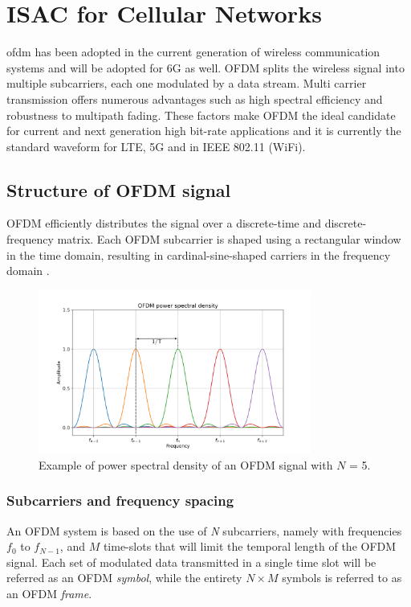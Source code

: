 \chapter{ISAC for Cellular Networks}
\label{chap:theoretical_OFDM}

\gls{ofdm} has been adopted in the current generation of wireless communication systems and will be adopted for 6G as well.
OFDM splits the wireless signal into multiple subcarriers, each one modulated by a data stream. Multi carrier transmission offers numerous advantages such as high spectral efficiency and robustness to multipath fading. These factors make OFDM the ideal candidate for current and next generation high bit-rate applications and it is currently the standard waveform for LTE, 5G and in IEEE 802.11 (WiFi).

\section{Structure of OFDM signal}

OFDM efficiently distributes the signal over a discrete-time and discrete-frequency matrix. Each OFDM subcarrier is shaped using a rectangular window in the time domain, resulting in cardinal-sine-shaped carriers in the frequency domain \cite{Schaich_Wild_2014}.

\begin{figure}[H]
    \centering
    \includegraphics[width=0.8\textwidth]{Images/theoretical/ofdm/ofdm_psd_mod.png}
    \caption{Example of power spectral density of an OFDM signal with $N$ = 5.}
    \label{fig:quadtree}
\end{figure}

\subsection{Subcarriers and frequency spacing}
An OFDM system is based on the use of \textit{N} subcarriers, namely with frequencies $f_0$ to $f_{N-1}$, and $M$ time-slots that will limit the temporal length of the OFDM signal.
Each set of modulated data transmitted in a single time slot will be referred as an OFDM \textit{symbol}, while the entirety $N\times M$ symbols is referred to as an OFDM \textit{frame}.

